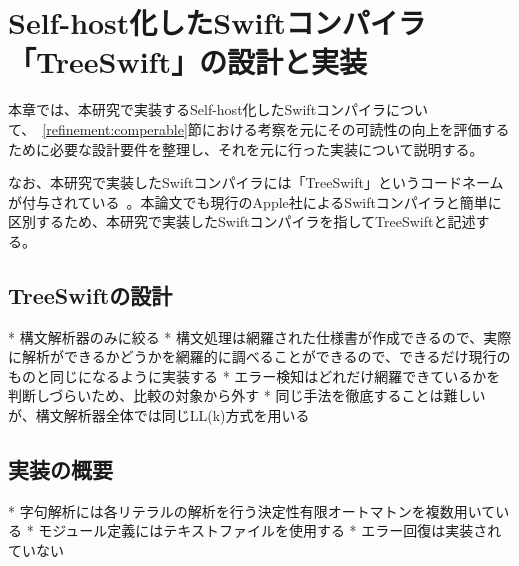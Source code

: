\chapter{Self-host化したSwiftコンパイラ「TreeSwift」の設計と実装}
\label{implementation}

本章では、本研究で実装するSelf-host化したSwiftコンパイラについて、~\ref{refinement:comperable}節における考察を元にその可読性の向上を評価するために必要な設計要件を整理し、それを元に行った実装について説明する。

なお、本研究で実装したSwiftコンパイラには「TreeSwift」というコードネームが付与されている~\cite{treeswift}。本論文でも現行のApple社によるSwiftコンパイラと簡単に区別するため、本研究で実装したSwiftコンパイラを指してTreeSwiftと記述する。

\section{TreeSwiftの設計}

* 構文解析器のみに絞る
* 構文処理は網羅された仕様書が作成できるので、実際に解析ができるかどうかを網羅的に調べることができるので、できるだけ現行のものと同じになるように実装する
* エラー検知はどれだけ網羅できているかを判断しづらいため、比較の対象から外す
* 同じ手法を徹底することは難しいが、構文解析器全体では同じLL(k)方式を用いる


\section{実装の概要}

* 字句解析には各リテラルの解析を行う決定性有限オートマトンを複数用いている
* モジュール定義にはテキストファイルを使用する
* エラー回復は実装されていない



